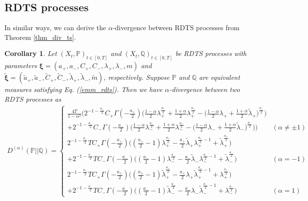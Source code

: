 \documentclass[preprint,11pt]{amsart}
\newtheorem{crl}{Corollary}
\begin{document}
\subsection{RDTS processes}
	In similar ways, we can derive the $\alpha$-divergence between RDTS processes from Theorem \ref{thm_div_ts}.
	
	\begin{crl}
		Let $(X_t, \mathbb{P})_{t\in[0,T]}$ and $(X_t, \mathbb{Q})_{t\in[0,T]}$ be RDTS processes with parameters $\boldsymbol{\xi}=(a_+, a_-, C_+, C_-,\lambda_+,\lambda_-,m)$ and $\tilde{\boldsymbol{\xi}}=(\tilde{a}_+, \tilde{a}_-, \tilde{C}_+, \tilde{C}_-,\tilde{\lambda}_+,\tilde{\lambda}_-,\tilde{m})$, respectively. Suppose $\mathbb{P}$ and $\mathbb{Q}$ are equivalent measures satisfying Eq. (\ref{emm_rdts}). Then we have $\alpha$-divergence between two RDTS processes as
	\begin{align}
	\label{a_div_rdts}
	D^{(\alpha )}(\mathbb{P}||\mathbb{Q})=\left\{ 
	\begin{array}{ll}
	\frac{4T}{1-\alpha ^{2}}\bigg(2^{-1-\frac{a_+}{2}}C_+\Gamma(-\frac{a_+}{2})\Big(\frac{1-\alpha}{2}\lambda_+^{\frac{a_+}{2}}+\frac{1+\alpha}{2}\lambda_+^{\frac{a_+}{2}}-\big(\frac{1-\alpha}{2}\lambda_++\frac{1+\alpha}{2}\tilde{\lambda}_+\big)^{\frac{a_+}{2}}\Big)\\
	+2^{-1-\frac{a_-}{2}}C_-\Gamma(-\frac{a_-}{2})\Big(\frac{1-\alpha}{2}\lambda_-^{\frac{a_-}{2}}+\frac{1+\alpha}{2}\lambda_-^{\frac{a_-}{2}}-\big(\frac{1-\alpha}{2}\lambda_-+\frac{1+\alpha}{2}\tilde{\lambda}_-\big)^{\frac{a_-}{2}}\Big)\bigg) & (\alpha \neq \pm 1)\\ 
	2^{-1-\frac{a_+}{2}}TC_+\Gamma(-\frac{a_+}{2})\big((\frac{a_+}{2}-1)\lambda_+^{\frac{a_+}{2}}-\frac{a_+}{2}\tilde{\lambda}_+\lambda_+^{\frac{a_+}{2}-1}+\tilde{\lambda}_+^{\frac{a_+}{2}}\big)\\
	+2^{-1-\frac{a_-}{2}}TC_-\Gamma(-\frac{a_-}{2})\big((\frac{a_-}{2}-1)\lambda_-^{\frac{a_-}{2}}-\frac{a_-}{2}\tilde{\lambda}_-\lambda_-^{\frac{a_-}{2}-1}+\tilde{\lambda}_-^{\frac{a_-}{2}}\big) & (\alpha =-1)\\
	2^{-1-\frac{a_+}{2}}TC_+\Gamma(-\frac{a_+}{2})\big((\frac{a_+}{2}-1)\tilde{\lambda}_+^{\frac{a_+}{2}}-\frac{a_+}{2}\lambda_+\tilde{\lambda}_+^{\frac{a_+}{2}-1}+\lambda_+^{\frac{a_+}{2}}\big)\\
	+2^{-1-\frac{a_-}{2}}TC_-\Gamma(-\frac{a_-}{2})\big((\frac{a_-}{2}-1)\tilde{\lambda}_-^{\frac{a_-}{2}}-\frac{a_-}{2}\lambda_-\tilde{\lambda}_-^{\frac{a_-}{2}-1}+\lambda_-^{\frac{a_-}{2}}\big) & (\alpha =1)
	\end{array}
	\right.
	\end{align}
	\end{crl}
\end{document}
